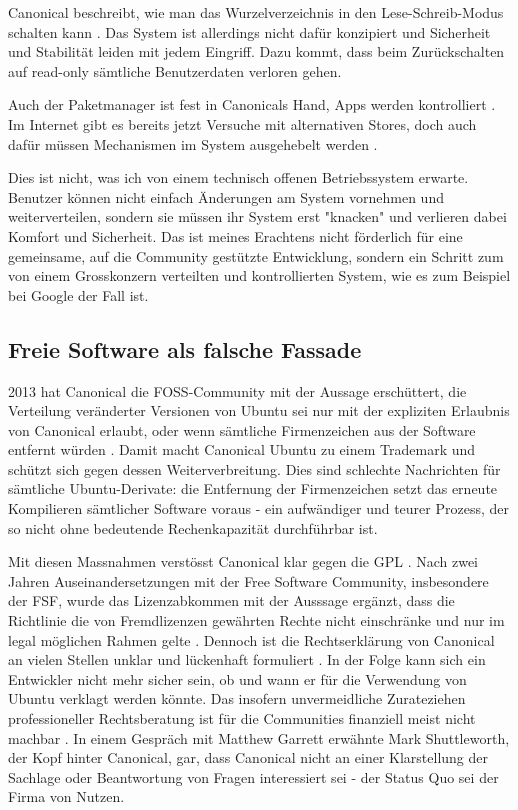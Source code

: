 Canonical beschreibt, wie man das Wurzelverzeichnis in den Lese-Schreib-Modus schalten kann \cite{online:ubuntutouch-readwrite}. Das System ist allerdings nicht dafür konzipiert und Sicherheit und Stabilität leiden mit jedem Eingriff. Dazu kommt, dass beim Zurückschalten auf read-only sämtliche Benutzerdaten verloren gehen.

Auch der Paketmanager ist fest in Canonicals Hand, Apps werden kontrolliert \cite{online:ubuntutouch-publish}. Im Internet gibt es bereits jetzt Versuche mit alternativen Stores, doch auch dafür müssen Mechanismen im System ausgehebelt werden \cite{online:ubuntutouch-jailbreak}.

Dies ist nicht, was ich von einem technisch offenen Betriebssystem erwarte. Benutzer können nicht einfach Änderungen am System vornehmen und weiterverteilen, sondern sie müssen ihr System erst "knacken" und verlieren dabei Komfort und Sicherheit. Das ist meines Erachtens nicht förderlich für eine gemeinsame, auf die Community gestützte Entwicklung, sondern ein Schritt zum von einem Grosskonzern verteilten und kontrollierten System, wie es zum Beispiel bei Google der Fall ist.

\subsection{Freie Software als falsche Fassade}
2013 hat Canonical die FOSS-Community mit der Aussage erschüttert, die Verteilung veränderter Versionen von Ubuntu sei nur mit der expliziten Erlaubnis von Canonical erlaubt, oder wenn sämtliche Firmenzeichen aus der Software entfernt würden \cite{online:ubuntutouch-mjgIn}. Damit macht Canonical Ubuntu zu einem Trademark und schützt sich gegen dessen Weiterverbreitung. Dies sind schlechte Nachrichten für sämtliche Ubuntu-Derivate: die Entfernung der Firmenzeichen setzt das erneute Kompilieren sämtlicher Software voraus \cite{online:ubuntutouch-mjgLicense} - ein aufwändiger und teurer Prozess, der so nicht ohne bedeutende Rechenkapazität durchführbar ist.

Mit diesen Massnahmen verstösst Canonical klar gegen die GPL \cite{online:ubuntutouch-fsf}. Nach zwei Jahren Auseinandersetzungen mit der Free Software Community, insbesondere der FSF, wurde das Lizenzabkommen mit der Ausssage ergänzt, dass die Richtlinie die von Fremdlizenzen gewährten Rechte nicht einschränke und nur im legal möglichen Rahmen gelte \cite{online:ubuntutouch-ip}. Dennoch ist die Rechtserklärung von Canonical an vielen Stellen unklar und lückenhaft formuliert \cite{online:ubuntutouch-uncertain}. In der Folge kann sich ein Entwickler nicht mehr sicher sein, ob und wann er für die Verwendung von Ubuntu verklagt werden könnte. Das insofern unvermeidliche Zurateziehen professioneller Rechtsberatung ist für die Communities finanziell meist nicht machbar \cite{online:ubuntutouch-mjgLicense}. In einem Gespräch mit Matthew Garrett \cite{online:ubuntutouch-mjgConversation} erwähnte Mark Shuttleworth, der Kopf hinter Canonical, gar, dass Canonical nicht an einer Klarstellung der Sachlage oder Beantwortung von Fragen interessiert sei - der Status Quo sei der Firma von Nutzen.

